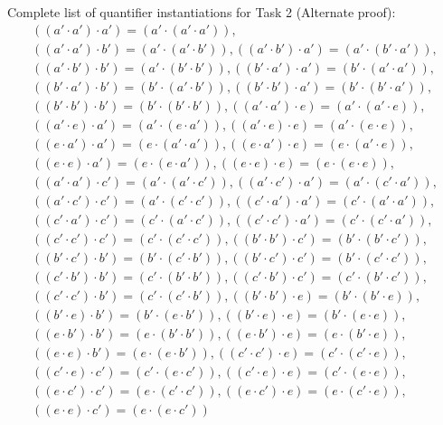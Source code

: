 \documentclass[12pt,letterpaper, onecolumn]{exam}
\begin{document}
\begin{questions}
	Complete list of quantifier instantiations for Task 2 (Alternate proof):
	\begin{align*}
		((a' \cdot a') \cdot a') = (a' \cdot (a' \cdot a'))  ,\\
		((a' \cdot a') \cdot b') = (a' \cdot (a' \cdot b'))  ,
		((a' \cdot b') \cdot a') = (a' \cdot (b' \cdot a'))  ,\\
		((a' \cdot b') \cdot b') = (a' \cdot (b' \cdot b'))  ,
		((b' \cdot a') \cdot a') = (b' \cdot (a' \cdot a'))  ,\\
		((b' \cdot a') \cdot b') = (b' \cdot (a' \cdot b'))  ,
		((b' \cdot b') \cdot a') = (b' \cdot (b' \cdot a'))  ,\\
		((b' \cdot b') \cdot b') = (b' \cdot (b' \cdot b'))  ,
		((a' \cdot a') \cdot e) = (a' \cdot (a' \cdot e))  ,\\
		((a' \cdot e) \cdot a') = (a' \cdot (e \cdot a'))  ,
		((a' \cdot e) \cdot e) = (a' \cdot (e \cdot e))  ,\\
		((e \cdot a') \cdot a') = (e \cdot (a' \cdot a'))  ,
		((e \cdot a') \cdot e) = (e \cdot (a' \cdot e))  ,\\
		((e \cdot e) \cdot a') = (e \cdot (e \cdot a'))  ,
		((e \cdot e) \cdot e) = (e \cdot (e \cdot e))  ,\\
		((a' \cdot a') \cdot c') = (a' \cdot (a' \cdot c'))  ,
		((a' \cdot c') \cdot a') = (a' \cdot (c' \cdot a'))  ,\\
		((a' \cdot c') \cdot c') = (a' \cdot (c' \cdot c'))  ,
		((c' \cdot a') \cdot a') = (c' \cdot (a' \cdot a'))  ,\\
		((c' \cdot a') \cdot c') = (c' \cdot (a' \cdot c'))  ,
		((c' \cdot c') \cdot a') = (c' \cdot (c' \cdot a'))  ,\\
		((c' \cdot c') \cdot c') = (c' \cdot (c' \cdot c'))  ,
		((b' \cdot b') \cdot c') = (b' \cdot (b' \cdot c'))  ,\\
		((b' \cdot c') \cdot b') = (b' \cdot (c' \cdot b'))  ,
		((b' \cdot c') \cdot c') = (b' \cdot (c' \cdot c'))  ,\\
		((c' \cdot b') \cdot b') = (c' \cdot (b' \cdot b'))  ,
		((c' \cdot b') \cdot c') = (c' \cdot (b' \cdot c'))  ,\\
		((c' \cdot c') \cdot b') = (c' \cdot (c' \cdot b'))  ,
		((b' \cdot b') \cdot e) = (b' \cdot (b' \cdot e))  ,\\
		((b' \cdot e) \cdot b') = (b' \cdot (e \cdot b'))  ,
		((b' \cdot e) \cdot e) = (b' \cdot (e \cdot e))  ,\\
		((e \cdot b') \cdot b') = (e \cdot (b' \cdot b'))  ,
		((e \cdot b') \cdot e) = (e \cdot (b' \cdot e))  ,\\
		((e \cdot e) \cdot b') = (e \cdot (e \cdot b'))  ,
		((c' \cdot c') \cdot e) = (c' \cdot (c' \cdot e))  ,\\
		((c' \cdot e) \cdot c') = (c' \cdot (e \cdot c'))  ,
		((c' \cdot e) \cdot e) = (c' \cdot (e \cdot e))  ,\\
		((e \cdot c') \cdot c') = (e \cdot (c' \cdot c'))  ,
		((e \cdot c') \cdot e) = (e \cdot (c' \cdot e))  ,\\
		((e \cdot e) \cdot c') = (e \cdot (e \cdot c')) 
	\end{align*}
	

\end{questions}
\end{document}
